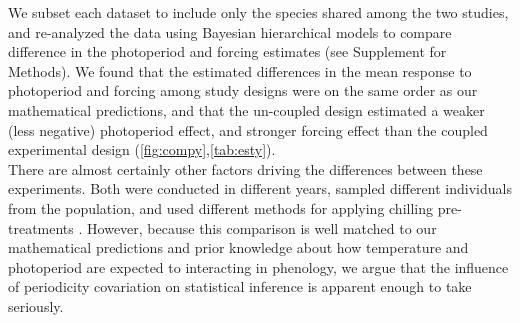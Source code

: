 \documentclass[11pt]{article}
\begin{document}
We subset each dataset to include only the species shared among the two studies, and re-analyzed the data using Bayesian hierarchical models to compare difference in the photoperiod and forcing estimates (see Supplement for Methods). We found that the estimated differences in the mean response to photoperiod and forcing%
among study designs were on the same order as our mathematical predictions, and that the un-coupled design estimated a weaker (less negative) photoperiod effect, and stronger forcing %
effect than the coupled experimental design (\ref{fig:compy},\ref{tab:esty}). \\

There are almost certainly other factors driving the differences between these experiments. Both were conducted in different years, sampled different individuals from the population, and used different methods for applying chilling pre-treatments \citep{Flynn2018,Buonaiuto:2021ug}. However, because this comparison is well matched to our mathematical predictions and prior knowledge about how temperature and photoperiod are expected to interacting in phenology, we argue that the influence of periodicity covariation on statistical inference is apparent enough to take seriously.\\
\end{document}
